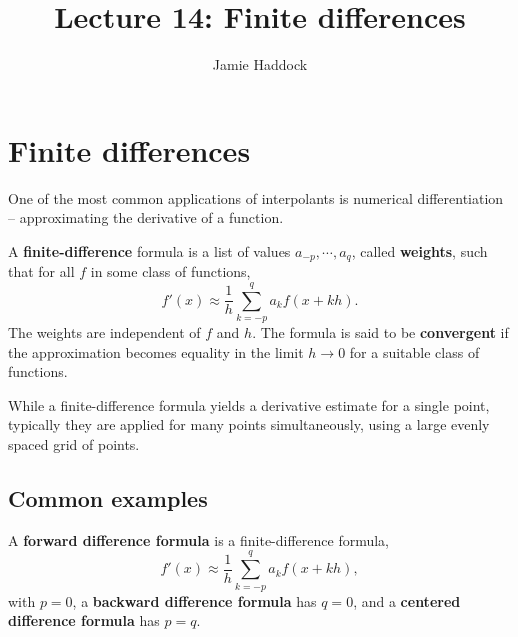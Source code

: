 \documentclass[
]{article}
\title{Lecture 14: Finite differences}
\author{Jamie Haddock}
\date{}
\renewcommand*\contentsname{Table of contents}
\newcommand\contentsname{Table of contents}
\begin{document}
\maketitle

\renewcommand*\contentsname{Table of contents}
{
\hypersetup{linkcolor=}
\setcounter{tocdepth}{3}
\tableofcontents
}

\section{Finite differences}\label{finite-differences}

One of the most common applications of interpolants is numerical
differentiation -- approximating the derivative of a function.

\begin{tcolorbox}[enhanced jigsaw, left=2mm, arc=.35mm, leftrule=.75mm, colbacktitle=quarto-callout-note-color!10!white, coltitle=black, toptitle=1mm, bottomtitle=1mm, colback=white, colframe=quarto-callout-note-color-frame, opacityback=0, breakable, titlerule=0mm, title={Definition: Finite-difference formula}, rightrule=.15mm, bottomrule=.15mm, toprule=.15mm, opacitybacktitle=0.6]

A \textbf{finite-difference} formula is a list of values
\(a_{-p}, \cdots, a_q\), called \textbf{weights}, such that for all
\(f\) in some class of functions,
\[f'(x) \approx \frac{1}{h} \sum_{k=-p}^q a_k f(x + kh).\] The weights
are independent of \(f\) and \(h\). The formula is said to be
\textbf{convergent} if the approximation becomes equality in the limit
\(h \rightarrow 0\) for a suitable class of functions.

\end{tcolorbox}

While a finite-difference formula yields a derivative estimate for a
single point, typically they are applied for many points simultaneously,
using a large evenly spaced grid of points.

\subsection{Common examples}\label{common-examples}

\begin{tcolorbox}[enhanced jigsaw, left=2mm, arc=.35mm, leftrule=.75mm, colbacktitle=quarto-callout-note-color!10!white, coltitle=black, toptitle=1mm, bottomtitle=1mm, colback=white, colframe=quarto-callout-note-color-frame, opacityback=0, breakable, titlerule=0mm, title={Definition: Forward, backward, and centered finite-difference formulas}, rightrule=.15mm, bottomrule=.15mm, toprule=.15mm, opacitybacktitle=0.6]

A \textbf{forward difference formula} is a finite-difference formula,
\[f'(x) \approx \frac{1}{h} \sum_{k=-p}^q a_k f(x + kh),\] with
\(p = 0\), a \textbf{backward difference formula} has \(q=0\), and a
\textbf{centered difference formula} has \(p=q\).

\end{tcolorbox}
\end{document}

